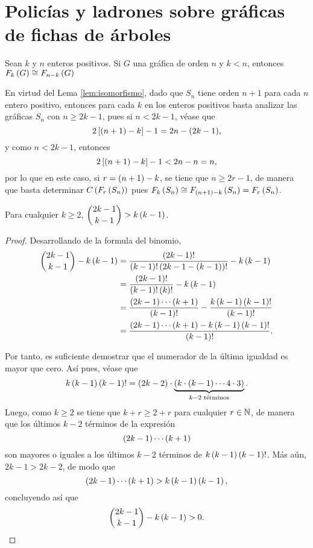 \chapter{Polic\'ias y ladrones sobre gr\'aficas de fichas de \'arboles}
\label{cap:resultados}

\begin{lema}
\label{lem:isomorfismo}
    Sean $k$ y $n$ enteros positivos. Si $G$ una gr\'afica de orden $n$ y $k <
    n$, entonces $F_{k}\left( G\right) \cong F_{n-k}\left( G\right)$
\end{lema}

En virtud del Lema \ref{lem:isomorfismo}, dado que $S_n$ tiene orden $n+1$ para
cada $n$ entero positivo, entonces para cada $k$ en los enteros positivos basta
analizar las gr\'aficas $S_n$ con $n\geq 2k-1$, pues si $n<2k-1$, v\'ease que
    $$2\left[ \left( n+1\right)-k\right]-1 = 2n - (2k-1),$$ y como $n<2k-1$, entonces
    $$2\left[ \left( n+1\right)-k\right]-1 < 2n - n = n,$$ por lo que en este caso, si
$r=\left( n+1\right)-k$, se tiene que $n\geq 2r-1$, de manera que basta determinar
$C\left( F_{r}\left( S_n\right)\right)$ pues $F_{k}\left( S_n\right)\cong F_{\left( n+1\right)-k}\left( S_n\right) = F_{r}\left( S_n\right)$.


\begin{lema}
\label{lem:desigualdad}
    Para cualquier $k\geq 2$, $\displaystyle\binom{2k-1}{k-1} > k\left( k-1\right)$.
\end{lema}
\begin{proof}
    Desarrollando de la formula del binomio,
    \begin{align*}
        \binom{2k-1}{k-1} - k\left( k-1\right) &= \frac{\left( 2k-1\right)!}{\left( k-1\right)!\left( 2k-1-\left( k-1\right)\right)!} - k\left( k-1\right) \\
        &= \frac{\left( 2k-1\right)!}{\left( k-1\right)!\left( k\right)!} - k\left( k-1\right) \\
        &= \frac{\left( 2k-1\right)\cdots \left( k+1\right)}{\left( k-1\right)!} - \frac{k\left( k-1\right)\left( k-1\right)!}{\left( k-1\right)!} \\
        &= \frac{\left( 2k-1\right)\cdots \left( k+1\right) - k\left( k-1\right)\left( k-1\right)!}{\left( k-1\right)!}.
    \end{align*}

    Por tanto, es suficiente demostrar que el numerador de la \'ultima igualdad
    es mayor que cero. As\'i pues, v\'ease que
        $$k\left( k-1\right)\left( k-1\right)! = \left( 2k-2\right)\cdot \underbrace{\left( k \cdot \left( k-1\right)\cdots
    4 \cdot 3\right)}_{k-2 \text{ t\'erminos}}.$$ Luego, como $k\geq 2$ se tiene que
    $k+r \geq 2+r$ para cualquier $r\in\mathbb{N}$, de manera que los \'ultimos $k-2$
    t\'erminos de la expresi\'on 
        $$\left( 2k-1\right)\cdots \left( k+1\right)$$ son mayores o iguales a los \'ultimos $k-2$
    t\'erminos de $k\left( k-1\right)\left( k-1\right)!$. M\'as a\'un, $2k-1 > 2k-2$, de modo que
        $$\left( 2k-1\right)\cdots \left( k+1\right) > k\left( k-1\right)\left( k-1\right),$$ concluyendo as\'i que
        $$\binom{2k-1}{k-1} - k\left( k-1\right) > 0.$$
\end{proof}

